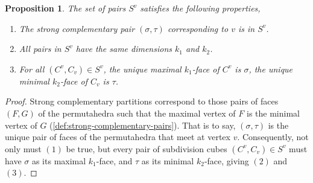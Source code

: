 \documentclass{amsart}
\newtheorem{proposition}[theorem]{Proposition}
\theoremstyle{definition}
\newcommand{\subdivpairsv}{S^v}
\begin{document}
\begin{proposition}\label{prop:ev properties}
The set of pairs $\subdivpairsv$ satisfies the following properties,
\begin{enumerate}
	\item The strong complementary pair $(\sigma,\tau)$ corresponding to $v$ is in $\subdivpairsv$.
	\item All pairs in $\subdivpairsv$ have the same dimensions $k_1$ and $k_2$.
	\item For all $(C^v,C_v) \in \subdivpairsv$, the unique maximal $k_1$-face of $C^v$ is $\sigma$, the unique minimal $k_2$-face of $C_v$ is $\tau$.
\end{enumerate}
\end{proposition}
\begin{proof}
Strong complementary partitions correspond to those pairs of faces $(F,G)$ of the permutahedra such that the maximal vertex of $F$ is the minimal vertex of $G$ (\cref{def:strong-complementary-pairs}).
That is to say, $(\sigma,\tau)$ is the unique pair of faces of the permutahedra that meet at vertex $v$.
Consequently, not only must $(1)$ be true, but every pair of subdivision cubes $(C^v,C_v) \in \subdivpairsv$ must have $\sigma$ as its maximal $k_1$-face, and $\tau$ as its minimal $k_2$-face, giving $(2)$ and $(3)$.
\end{proof}
\end{document}
